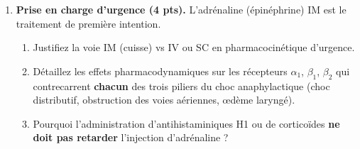 \documentclass[11pt]{article}
\begin{document}
\begin{exercice}
\begin{enumerate}
    \item \textbf{Prise en charge d'urgence (4 pts).} L'adrénaline (épinéphrine) IM est le traitement de première intention.
    \begin{enumerate}
        \item Justifiez la voie IM (cuisse) vs IV ou SC en pharmacocinétique d'urgence.
        \item Détaillez les effets pharmacodynamiques sur les récepteurs $\alpha_1$, $\beta_1$, $\beta_2$ qui contrecarrent \textbf{chacun} des trois piliers du choc anaphylactique (choc distributif, obstruction des voies aériennes, œdème laryngé).
        \item Pourquoi l'administration d'antihistaminiques H1 ou de corticoïdes \textbf{ne doit pas retarder} l'injection d'adrénaline ?
    \end{enumerate}
\end{enumerate}
\end{exercice}
\end{document}
